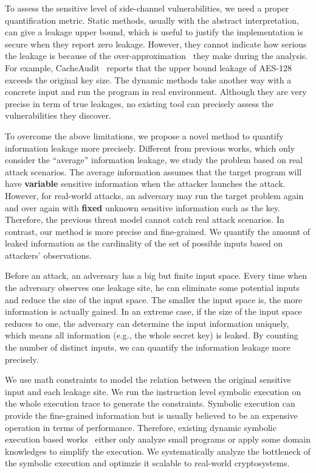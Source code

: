 To assess the sensitive level of side-channel vulnerabilities, we need a proper 
quantification metric.
Static methods, usually with the abstract interpretation, can give a leakage upper bound, 
which is useful to justify the implementation is secure when they report zero leakage. 
However, they cannot indicate how serious the leakage is because of the over-approximation~\cite{}
they make during the analysis. 
For example, CacheAudit~\cite{} reports that the upper bound leakage of AES-128 exceeds 
the original key size. The dynamic methods take another way with a concrete input and 
run the program in real environment. Although they are very precise in term of true leakages, 
no existing tool can precisely assess the vulnerabilities they discover.

To overcome the above limitations, we propose a novel method
to quantify information leakage more precisely. 
Different from previous works, which only consider the
``average'' information leakage, we study the problem based on real attack scenarios.
The average information assumes that the target program will have \textbf{variable} sensitive 
information when the attacker launches the attack.
However, for real-world attacks, an adversary may run the target problem again and over again 
with \textbf{fixed} unknown sensitive information such as the key. 
Therefore, the previous threat model cannot catch real attack scenarios.
In contrast, our method is more precise and fine-grained. 
We quantify the amount of leaked information as the cardinality of the set of 
possible inputs based on attackers' observations. 

Before an attack, an adversary has a big but finite input space.
Every time when the adversary observes one leakage site, he can eliminate some 
potential inputs and reduce the size of the input space. 
The smaller the input space is, the more information is actually gained. 
In an extreme case, if the size of the input space reduces to one, 
the adversary can determine the input information uniquely, which means all information
(e.g., the whole secret key) is leaked. By counting the number of distinct inputs, 
we can quantify the information leakage more precisely. 

We use math constraints to model the relation between the original sensitive input and
each leakage site. We run the instruction level symbolic execution on the whole
execution trace to generate the constraints. Symbolic execution can provide the fine-grained
information but is usually believed to be an expensive operation in terms of performance. 
Therefore, existing dynamic symbolic execution based works~\cite{} either only analyze 
small programs or apply some domain knowledges to simplify the execution. We systematically
analyze the bottleneck of the symbolic execution and optimzie it scalable to
real-world cryptosystems. 

